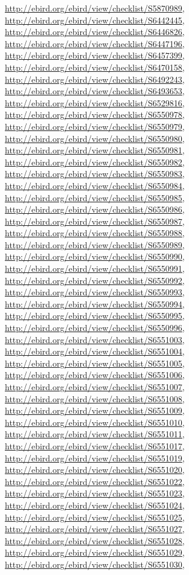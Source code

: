 \documentclass[9pt, article]{memoir}
\begin{document}
\begin{multicols}{2}
\url{http://ebird.org/ebird/view/checklist/S5870989}, 
\url{http://ebird.org/ebird/view/checklist/S6442445}, 
\url{http://ebird.org/ebird/view/checklist/S6446826}, 
\url{http://ebird.org/ebird/view/checklist/S6447196}, 
\url{http://ebird.org/ebird/view/checklist/S6457399}, 
\url{http://ebird.org/ebird/view/checklist/S6470158}, 
\url{http://ebird.org/ebird/view/checklist/S6492243}, 
\url{http://ebird.org/ebird/view/checklist/S6493653}, 
\url{http://ebird.org/ebird/view/checklist/S6529816}, 
\url{http://ebird.org/ebird/view/checklist/S6550978}, 
\url{http://ebird.org/ebird/view/checklist/S6550979}, 
\url{http://ebird.org/ebird/view/checklist/S6550980}, 
\url{http://ebird.org/ebird/view/checklist/S6550981}, 
\url{http://ebird.org/ebird/view/checklist/S6550982}, 
\url{http://ebird.org/ebird/view/checklist/S6550983}, 
\url{http://ebird.org/ebird/view/checklist/S6550984}, 
\url{http://ebird.org/ebird/view/checklist/S6550985}, 
\url{http://ebird.org/ebird/view/checklist/S6550986}, 
\url{http://ebird.org/ebird/view/checklist/S6550987}, 
\url{http://ebird.org/ebird/view/checklist/S6550988}, 
\url{http://ebird.org/ebird/view/checklist/S6550989}, 
\url{http://ebird.org/ebird/view/checklist/S6550990}, 
\url{http://ebird.org/ebird/view/checklist/S6550991}, 
\url{http://ebird.org/ebird/view/checklist/S6550992}, 
\url{http://ebird.org/ebird/view/checklist/S6550993}, 
\url{http://ebird.org/ebird/view/checklist/S6550994}, 
\url{http://ebird.org/ebird/view/checklist/S6550995}, 
\url{http://ebird.org/ebird/view/checklist/S6550996}, 
\url{http://ebird.org/ebird/view/checklist/S6551003}, 
\url{http://ebird.org/ebird/view/checklist/S6551004}, 
\url{http://ebird.org/ebird/view/checklist/S6551005}, 
\url{http://ebird.org/ebird/view/checklist/S6551006}, 
\url{http://ebird.org/ebird/view/checklist/S6551007}, 
\url{http://ebird.org/ebird/view/checklist/S6551008}, 
\url{http://ebird.org/ebird/view/checklist/S6551009}, 
\url{http://ebird.org/ebird/view/checklist/S6551010}, 
\url{http://ebird.org/ebird/view/checklist/S6551011}, 
\url{http://ebird.org/ebird/view/checklist/S6551017}, 
\url{http://ebird.org/ebird/view/checklist/S6551019}, 
\url{http://ebird.org/ebird/view/checklist/S6551020}, 
\url{http://ebird.org/ebird/view/checklist/S6551022}, 
\url{http://ebird.org/ebird/view/checklist/S6551023}, 
\url{http://ebird.org/ebird/view/checklist/S6551024}, 
\url{http://ebird.org/ebird/view/checklist/S6551025}, 
\url{http://ebird.org/ebird/view/checklist/S6551027}, 
\url{http://ebird.org/ebird/view/checklist/S6551028}, 
\url{http://ebird.org/ebird/view/checklist/S6551029}, 
\url{http://ebird.org/ebird/view/checklist/S6551030}, 

\end{multicols}
\end{document}
